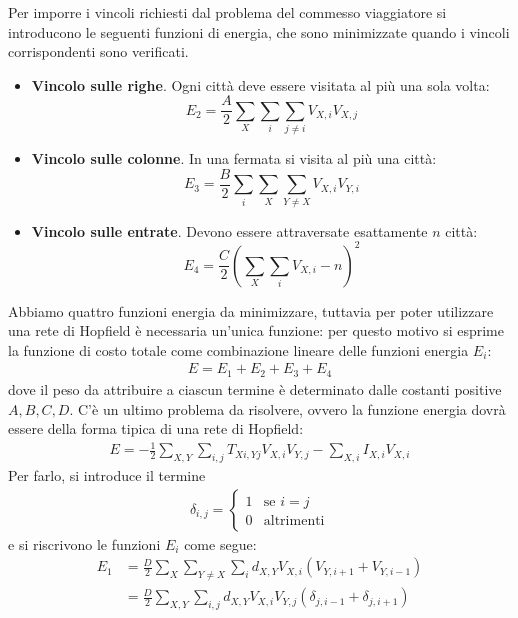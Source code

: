 Per imporre i vincoli richiesti dal problema del commesso viaggiatore si introducono le seguenti funzioni di energia, che sono minimizzate quando i vincoli corrispondenti sono verificati.
\begin{itemize}
	\item \textbf{Vincolo sulle righe}. Ogni città deve essere visitata al più una sola volta:
	\begin{displaymath}
		E_2 = \frac{A}{2} \sum_X \sum_i \sum_{j \neq i} V_{X,i} V_{X,j}
	\end{displaymath}
	\item \textbf{Vincolo sulle colonne}. In una fermata si visita al più una città:
	\begin{displaymath}
		E_3 = \frac{B}{2} \sum_i \sum_X \sum_{Y \neq X} V_{X,i} V_{Y,i}
	\end{displaymath}
	\item \textbf{Vincolo sulle entrate}. Devono essere attraversate esattamente $n$ città:
	\begin{displaymath}
		E_4 = \frac{C}{2}\left(\sum_X \sum_i V_{X,i} - n \right)^2
	\end{displaymath}
\end{itemize}
Abbiamo quattro funzioni energia da minimizzare, tuttavia per poter utilizzare una rete di Hopfield è necessaria un'unica funzione: per questo motivo si esprime la funzione di costo totale come combinazione lineare delle funzioni energia $E_i$:
\begin{align}
	E = E_1 + E_2 + E_3 + E_4
\end{align}
dove il peso da attribuire a ciascun termine è determinato dalle costanti positive $A, B, C, D$. C'è un ultimo problema da risolvere, ovvero la funzione energia dovrà essere della forma tipica di una rete di Hopfield:
\begin{align*}
	E = - \frac{1}{2} \sum_{X, Y} \sum_{i, j} T_{Xi, Yj} V_{X, i} V_{Y, j} - \sum_{X, i} I_{X, i} V_{X, i}
\end{align*}
Per farlo, si introduce il termine
\begin{align*}
	\delta_{i,j} = \begin{cases}
		1 & \text{se } i = j \\
		0 & \text{altrimenti}
	\end{cases}
\end{align*}
e si riscrivono le funzioni $E_i$ come segue:
\begin{align*}
	E_1 &= \frac{D}{2} \sum_X \sum_{Y \neq X} \sum_i d_{X,Y} V_{X,i} (V_{Y, i+1} + V_{Y, i-1}) \\
	&=  \frac{D}{2} \sum_{X,Y} \sum_{i,j} d_{X,Y} V_{X,i} V_{Y,j} (\delta_{j, i-1} + \delta_{j, i+1})
\end{align*}

